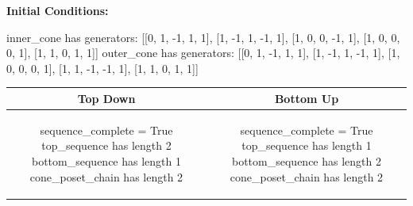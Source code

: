 \documentclass[10pt]{article}
\begin{document}
\textbf{Initial Conditions:}
\begin{SAGE}
inner_cone has generators: 
[[0, 1, -1, 1, 1], [1, -1, 1, -1, 1], [1, 0, 0, -1, 1], [1, 0, 0, 0, 1], [1, 1, 0, 1, 1]]
outer_cone has generators: 
[[0, 1, -1, 1, 1], [1, -1, 1, -1, 1], [1, 0, 0, 0, 1], [1, 1, -1, -1, 1], [1, 1, 0, 1, 1]]

\end{SAGE}
\begin{tabular}{c|c}
\textbf{Top Down} & \textbf{Bottom Up} \\ \hline  
\begin{SAGE}
sequence_complete = True
top_sequence has length 2
bottom_sequence has length 1
cone_poset_chain has length 2
\end{SAGE} 
&
\begin{SAGE}
sequence_complete = True
top_sequence has length 1
bottom_sequence has length 2
cone_poset_chain has length 2
\end{SAGE} 
\\ \hline


\end{tabular}
\end{document}
